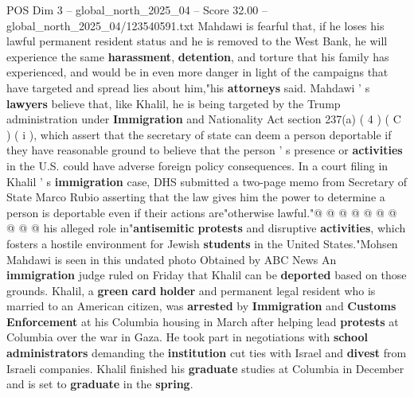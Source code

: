 \begin{textsample}{POS Dim 3 – global\_north\_2025\_04 – Score 32.00 – global\_north\_2025\_04/123540591.txt}
Mahdawi is fearful that, if he loses his lawful permanent resident status and he is removed to the West Bank, he will experience the same \textbf{harassment}, \textbf{detention}, and torture that his family has experienced, and would be in even more danger in light of the campaigns that have targeted and spread lies about him,"his \textbf{attorneys} said.
Mahdawi ' s \textbf{lawyers} believe that, like Khalil, he is being targeted by the Trump administration under \textbf{Immigration} and Nationality Act section 237(a) ( 4 ) ( C ) ( i ), which assert that the secretary of state can deem a person deportable if they have reasonable ground to believe that the person ' s presence or \textbf{activities} in the U.S. could have adverse foreign policy consequences.
In a court filing in Khalil ' s \textbf{immigration} case, DHS submitted a two-page memo from Secretary of State Marco Rubio asserting that the law gives him the power to determine a person is deportable even if their actions are"otherwise lawful."@ @ @ @ @ @ @ @ @ @ his alleged role in"\textbf{antisemitic} \textbf{protests} and disruptive \textbf{activities}, which fosters a hostile environment for Jewish \textbf{students} in the United States."Mohsen Mahdawi is seen in this undated photo Obtained by ABC News An \textbf{immigration} judge ruled on Friday that Khalil can be \textbf{deported} based on those grounds.
Khalil, a \textbf{green} \textbf{card} \textbf{holder} and permanent legal resident who is married to an American citizen, was \textbf{arrested} by \textbf{Immigration} and \textbf{Customs} \textbf{Enforcement} at his Columbia housing in March after helping lead \textbf{protests} at Columbia over the war in Gaza.
He took part in negotiations with \textbf{school} \textbf{administrators} demanding the \textbf{institution} cut ties with Israel and \textbf{divest} from Israeli companies.
Khalil finished his \textbf{graduate} studies at Columbia in December and is set to \textbf{graduate} in the \textbf{spring}.

\end{textsample}
